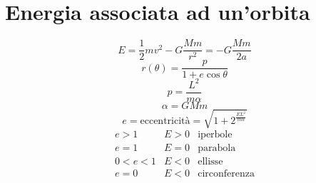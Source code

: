 \section{Energia associata ad un'orbita}
\begin{equation*}E=\frac{1}{2}mv^2-G\frac{Mm}{r^2}=-G\frac{Mm}{2a}\end{equation*}
\begin{equation*}r(\theta)=\frac{p}{1+e\cos\theta}\end{equation*}
\begin{equation*}p=\frac{L^2}{m\alpha}\end{equation*}
\begin{equation*}\alpha=GMm\end{equation*}
\begin{equation*}e=\text{eccentricità}=\sqrt{1+2^{\frac{EL^2}{m\alpha}}}\end{equation*}
\[\begin{array}{llc}
e>1&E>0&\text{iperbole}\\
e=1&E=0&\text{parabola}\\
0<e<1&E<0&\text{ellisse}\\
e=0&E<0&\text{circonferenza}\\
\end{array}\]
